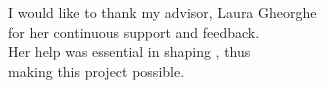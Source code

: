 \vspace*{7cm}
\begin{center}
I would like to thank my advisor, Laura Gheorghe\\
for her continuous support and feedback.\\
Her help was essential in shaping \project, thus \\
making this project possible.
\end{center}
